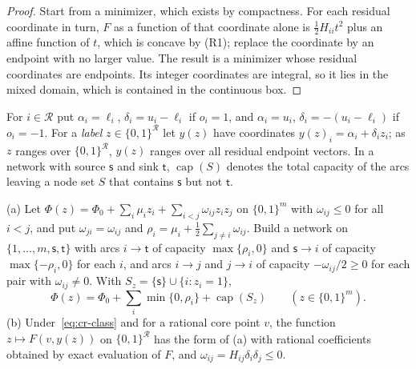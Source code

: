 \begin{proof}
Start from a minimizer, which exists by compactness. For each residual
coordinate in turn, $F$ as a function of that coordinate alone is
$\frac12H_{ii}t^2$ plus an affine function of $t$, which is concave by
(R1); replace the coordinate by an endpoint with no larger value. The
result is a minimizer whose residual coordinates are endpoints. Its integer
coordinates are integral, so it lies in the mixed domain, which is
contained in the continuous box.
\end{proof}

For $i\in\mathcal R$ put $\alpha_i=\ell_i$, $\delta_i=u_i-\ell_i$ if $o_i=1$,
and $\alpha_i=u_i$, $\delta_i=-(u_i-\ell_i)$ if $o_i=-1$. For a
\emph{label} $z\in\{0,1\}^{\mathcal R}$ let $y(z)$ have coordinates
$y(z)_i=\alpha_i+\delta_iz_i$; as $z$ ranges over $\{0,1\}^{\mathcal R}$,
$y(z)$ ranges over all residual endpoint vectors. In a
network with source $\mathsf s$ and sink $\mathsf t$, $\operatorname{cap}(S)$
denotes the total capacity of the arcs leaving a node set $S$ that contains
$\mathsf s$ but not $\mathsf t$.

\begin{proposition}\label{prop:cr-cut}
(a) Let $\Phi(z)=\Phi_0+\sum_i\mu_iz_i+\sum_{i<j}\omega_{ij}z_iz_j$ on
$\{0,1\}^m$ with $\omega_{ij}\le0$ for all $i<j$, and put
$\omega_{ji}=\omega_{ij}$ and $\rho_i=\mu_i+\frac12\sum_{j\ne i}\omega_{ij}$.
Build a network on $\{1,\dots,m,\mathsf s,\mathsf t\}$
with arcs $i\to\mathsf t$ of capacity $\max\{\rho_i,0\}$ and
$\mathsf s\to i$ of capacity $\max\{-\rho_i,0\}$ for each $i$, and arcs
$i\to j$ and $j\to i$ of capacity $-\omega_{ij}/2\ge0$ for each pair with
$\omega_{ij}\ne0$. With $S_z=\{\mathsf s\}\cup\{i:z_i=1\}$,
\begin{equation}\label{eq:cr-cutid}
\Phi(z)=\Phi_0+\sum_i\min\{0,\rho_i\}+\operatorname{cap}(S_z)
\qquad(z\in\{0,1\}^m).
\end{equation}
(b) Under~\eqref{eq:cr-class} and for a rational core point $v$, the
function $z\mapsto F(v,y(z))$ on $\{0,1\}^{\mathcal R}$ has the form of (a)
with rational coefficients obtained by exact evaluation of $F$, and
$\omega_{ij}=H_{ij}\delta_i\delta_j\le0$.
\end{proposition}

